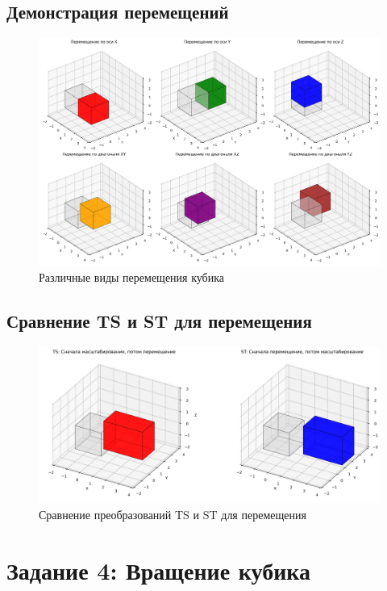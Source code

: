 \subsection*{Демонстрация перемещений}

\begin{figure}[h]
\centering
\includegraphics[width=\textwidth]{images/task3/translation_transformations.png}
\caption{Различные виды перемещения кубика}
\label{fig:translation_transformations}
\end{figure}

\subsection*{Сравнение TS и ST для перемещения}

\begin{figure}[h]
\centering
\includegraphics[width=\textwidth]{images/task3/TS_vs_ST_translation.png}
\caption{Сравнение преобразований TS и ST для перемещения}
\label{fig:TS_vs_ST_translation}
\end{figure}

\section*{Задание 4: Вращение кубика}

